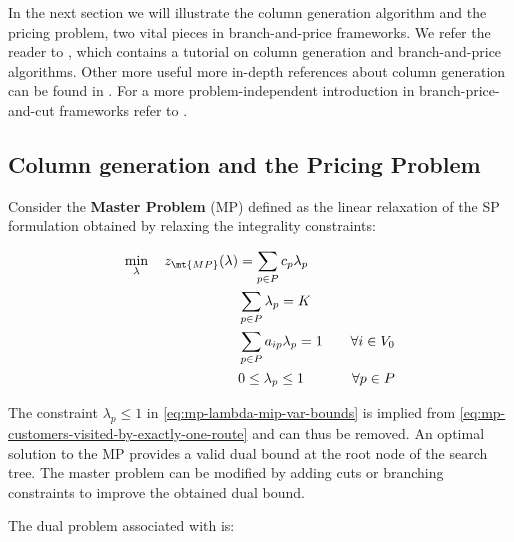 In the next section we will illustrate the column generation algorithm
and the pricing problem, two vital pieces in branch-and-price frameworks.
We refer the reader to \textcite{feillet2010}, which contains a tutorial
on column generation and branch-and-price algorithms.
Other more useful more in-depth references about column generation can be found in \textcite{desrosiers2005, lubbecke2005}.
For a more problem-independent introduction in branch-price-and-cut frameworks refer to \textcite{desrosiers2011}.


\subsection{Column generation and the Pricing Problem}
\label{sec:column-generation-and-pricing-problem}

Consider the \textbf{Master Problem} (MP) defined
as the linear relaxation of the SP formulation obtained by relaxing the integrality constraints:

\begin{align}
	\min_{\lambda} \quad z_\mt{MP}(\lambda) & = \sum_{p \in P}  c_p \lambda_p \label{eq:mp-obj-func}                                                                                                                             \\
	                                        & \sum_{p \in P} \lambda_{p} = K\label{eq:mp-K-routes}                                                                                                                               \\
	                                        & \sum_{p \in P}  a_{ip} \lambda_p = 1                   & \quad \forall i \in V_0                                              \label{eq:mp-customers-visited-by-exactly-one-route} \\
	                                        & 0 \le \lambda_p \le 1                                  & \quad \forall p \in P \label{eq:mp-lambda-mip-var-bounds}
\end{align}


The constraint $\lambda_p \le 1$ in \cref{eq:mp-lambda-mip-var-bounds} is implied from \cref{eq:mp-customers-visited-by-exactly-one-route} and can thus be removed.
An optimal solution to the MP provides a valid dual bound at the root node of the search tree.
The master problem can be modified by adding cuts or branching constraints to improve the obtained dual bound.

The dual problem associated with 
is:

